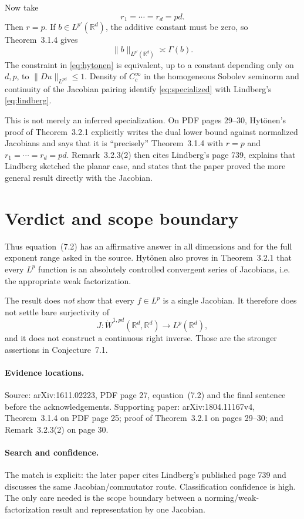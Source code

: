 \documentclass[11pt]{article}
\newcommand{\R}{\mathbb R}
\newcommand{\Wdot}{\dot W}
\newcommand{\norm}[1]{\lVert #1\rVert}
\begin{document}
Now take
\[
 r_1=\cdots=r_d=pd.
\]
Then $r=p$.  If $b\in L^{p'}(\R^d)$, the additive constant must be zero, so
Theorem~3.1.4 gives
\begin{equation}\label{eq:specialized}
 \norm{b}_{L^{p'}(\R^d)}\asymp \Gamma(b).
\end{equation}
The constraint in \eqref{eq:hytonen} is equivalent, up to a constant
depending only on $d,p$, to $\norm{Du}_{L^{pd}}\le1$.  Density of
$C_c^\infty$ in the homogeneous Sobolev seminorm and continuity of the
Jacobian pairing identify \eqref{eq:specialized} with Lindberg's
\eqref{eq:lindberg}.

This is not merely an inferred specialization.  On PDF pages 29--30,
Hyt\"onen's proof of Theorem~3.2.1 explicitly writes the dual lower bound
against normalized Jacobians and says that it is ``precisely''
Theorem~3.1.4 with $r=p$ and $r_1=\cdots=r_d=pd$.  Remark~3.2.3(2) then
cites Lindberg's page 739, explains that Lindberg sketched the planar case,
and states that the paper proved the more general result directly with the
Jacobian.

\section{Verdict and scope boundary}

Thus equation~(7.2) has an affirmative answer in all dimensions and for the
full exponent range asked in the source.  Hyt\"onen also proves in
Theorem~3.2.1 that every $L^p$ function is an absolutely controlled
convergent series of Jacobians, i.e. the appropriate weak factorization.

The result does \emph{not} show that every $f\in L^p$ is a single Jacobian.
It therefore does not settle bare surjectivity of
\[
 J:\Wdot^{1,pd}(\R^d,\R^d)\longrightarrow L^p(\R^d),
\]
and it does not construct a continuous right inverse.  Those are the
stronger assertions in Conjecture~7.1.

\paragraph{Evidence locations.}
Source: arXiv:1611.02223, PDF page 27, equation~(7.2) and the final sentence
before the acknowledgements.  Supporting paper: arXiv:1804.11167v4,
Theorem~3.1.4 on PDF page 25; proof of Theorem~3.2.1 on pages 29--30; and
Remark~3.2.3(2) on page 30.

\paragraph{Search and confidence.}
The match is explicit: the later paper cites Lindberg's published page 739
and discusses the same Jacobian/commutator route.  Classification confidence
is high.  The only care needed is the scope boundary between a norming/weak-
factorization result and representation by one Jacobian.
\end{document}
